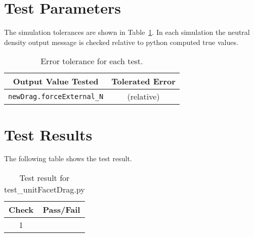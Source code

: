 \section{Test Parameters}
The simulation tolerances are shown in Table~\ref{tab:errortol}.  In each simulation the neutral density output message is checked relative to python computed true values.  
\begin{table}[htbp]
	\caption{Error tolerance for each test.}
	\label{tab:errortol}
	\centering \fontsize{10}{10}\selectfont
	\begin{tabular}{ c | c } %
		\hline\hline
		\textbf{Output Value Tested}  & \textbf{Tolerated Error}  \\ 
		\hline
		{\tt newDrag.forceExternal\_N}        &  (relative)   \\ 		\hline\hline
	\end{tabular}
\end{table}




\section{Test Results}
The following table shows the test result.


\begin{table}[H]
	\caption{Test result for test\_unitFacetDrag.py}
	\label{tab:results}
	\centering \fontsize{10}{10}\selectfont
	\begin{tabular}{c  | c } %
		\hline\hline
		\textbf{Check} &  \textbf{Pass/Fail} \\ 
		\hline
		1 &   \\ 
		\hline
		\hline
	\end{tabular}
\end{table}



